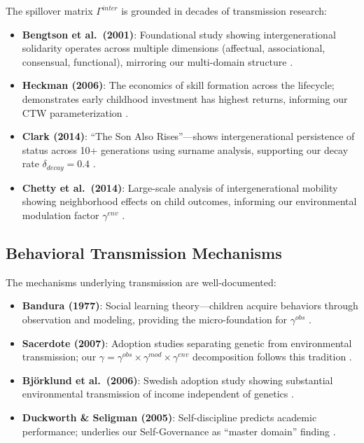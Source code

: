 The spillover matrix $\Gamma^{inter}$ is grounded in decades of transmission research:

\begin{itemize}
\item \textbf{Bengtson et al.~(2001)}: Foundational study showing intergenerational
      solidarity operates across multiple dimensions (affectual, associational,
      consensual, functional), mirroring our multi-domain structure \citep{bengtson2001families}.

\item \textbf{Heckman (2006)}: The economics of skill formation across the lifecycle;
      demonstrates early childhood investment has highest returns, informing our
      CTW parameterization \citep{heckman2006skill}.

\item \textbf{Clark (2014)}: ``The Son Also Rises''---shows intergenerational persistence
      of status across 10+ generations using surname analysis, supporting our
      decay rate $\delta_{decay} = 0.4$ \citep{clark2014son}.

\item \textbf{Chetty et al.~(2014)}: Large-scale analysis of intergenerational mobility
      showing neighborhood effects on child outcomes, informing our environmental
      modulation factor $\gamma^{env}$ \citep{chetty2014land}.
\end{itemize}

\subsection{Behavioral Transmission Mechanisms}

The mechanisms underlying transmission are well-documented:

\begin{itemize}
\item \textbf{Bandura (1977)}: Social learning theory---children acquire behaviors through
      observation and modeling, providing the micro-foundation for $\gamma^{obs}$
      \citep{bandura1977social}.

\item \textbf{Sacerdote (2007)}: Adoption studies separating genetic from environmental
      transmission; our $\gamma = \gamma^{obs} \times \gamma^{mod} \times \gamma^{env}$
      decomposition follows this tradition \citep{sacerdote2007nature}.

\item \textbf{Björklund et al.~(2006)}: Swedish adoption study showing substantial
      environmental transmission of income independent of genetics \citep{bjorklund2006genes}.

\item \textbf{Duckworth \& Seligman (2005)}: Self-discipline predicts academic performance;
      underlies our Self-Governance as ``master domain'' finding \citep{duckworth2005self}.
\end{itemize}

